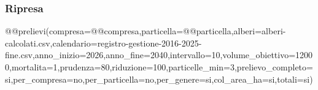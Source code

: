 {\subsubsection*{Ripresa}
@@prelievi(compresa=@@compresa,particella=@@particella,alberi=alberi-calcolati.csv,calendario=registro-gestione-2016-2025-fine.csv,anno_inizio=2026,anno_fine=2040,intervallo=10,volume_obiettivo=12000,mortalita=1,prudenza=80,riduzione=100,particelle_min=3,prelievo_completo=si,per_compresa=no,per_particella=no,per_genere=si,col_area_ha=si,totali=si)

}
\clearpage

